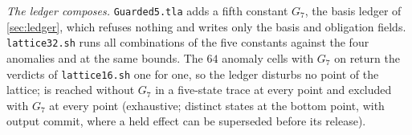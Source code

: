 \smallskip\noindent\emph{The ledger composes.} \texttt{Guarded5.tla} adds a
fifth constant $G_7$, the basis ledger of \cref{sec:ledger}, which refuses
nothing and writes only the basis and obligation fields.
\texttt{lattice32.sh} runs all \LatticeThirtyTwoRuns{} combinations of the
five constants against the four anomalies and \Rp{} at the same bounds. The
$64$ anomaly cells with $G_7$ on return the verdicts of \texttt{lattice16.sh}
one for one, so the ledger disturbs no point of the lattice; \Rp{} is
reached without $G_7$ in a five-state trace at every point and excluded
with $G_7$ at every point (exhaustive; \NoAsevenStates{} distinct states at
the bottom point, \NoAsevenStatesGthree{} with output commit, where a held
effect can be superseded before its release). \LatticeThirtyTwoOutcome{}
